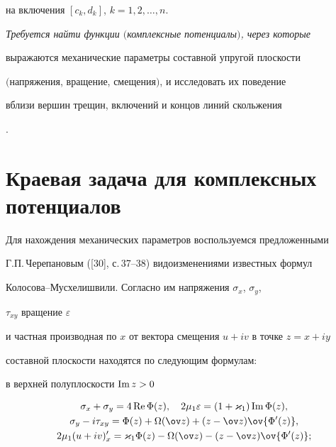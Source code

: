 на включения $[c_k,d_k]$, $k=1,2,\dotsc,n$. 


 


{\it Требуется найти функции $($комплексные потенциалы$)$, через которые 


выражаются механические параметры составной упругой плоскости 


$($напряжения, вращение, смещения$)$, и исследовать их поведение 


вблизи вершин трещин, включений и концов линий скольжения}. 


 


 


\section{Краевая задача для комплексных потенциалов} 


 


Для нахождения механических параметров воспользуемся предложенными 


Г.П.\,Че\-ре\-па\-но\-вым ([30], с.\,37--38) видоизменениями известных формул 


Колосова--Мусхелишвили. Согласно им напряжения $\sigma_x$, $\sigma_y$, 


$\tau_{xy}$ вращение $\varepsilon$ 


и частная производная по $x$ от вектора смещения $u+iv$ в точке $z=x+iy$ 


составной плоскости находятся по следующим формулам: 


 


в верхней полуплоскости $\operatorname{Im} z>0$ 


\begin{gather} 


\sigma_x+\sigma_y=4\re\Phi(z),\quad 2\mu_1\varepsilon= 


(1+\varkappa_1)\im\Phi(z),\notag\\ 


\sigma_y-i\tau_{xy}=\Phi(z)+\Omega(\ov z)+(z-\ov z) 


\ov{\Phi'(z)},\\ 


2\mu_1(u+iv)'_x=\varkappa_1\Phi(z)-\Omega(\ov z)-(z-\ov z) 


\ov{\Phi'(z)};\notag 


\end{gather} 


